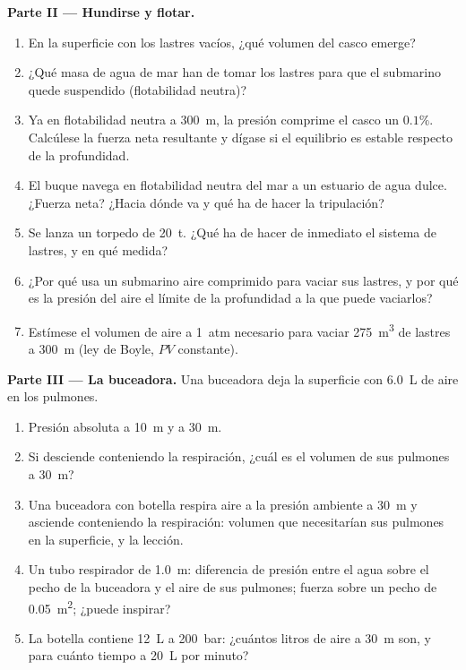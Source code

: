 \begin{problem}
\medskip
\noindent\textbf{Parte II --- Hundirse y flotar.}
\begin{enumerate}[resume]
  \item En la superficie con los lastres vacíos, ¿qué volumen del casco
        emerge?
  \item ¿Qué masa de agua de mar han de tomar los lastres para que el
        submarino quede suspendido (flotabilidad neutra)?
  \item Ya en flotabilidad neutra a \qty{300}{m}, la presión comprime el
        casco un $0.1\%$. Calcúlese la fuerza neta resultante y dígase si el
        equilibrio es estable respecto de la profundidad.
  \item El buque navega en flotabilidad neutra del mar a un estuario de
        agua dulce. ¿Fuerza neta? ¿Hacia dónde va y qué ha de hacer la
        tripulación?
  \item Se lanza un torpedo de \qty{20}{t}. ¿Qué ha de hacer de inmediato el
        sistema de lastres, y en qué medida?
  \item ¿Por qué usa un submarino aire comprimido para vaciar sus lastres, y
        por qué es la presión del aire el límite de la profundidad a la que
        puede vaciarlos?
  \item Estímese el volumen de aire a \qty{1}{atm} necesario para vaciar
        \qty{275}{m^3} de lastres a \qty{300}{m} (ley de Boyle, $PV$
        constante).
\end{enumerate}

\medskip
\noindent\textbf{Parte III --- La buceadora.}
Una buceadora deja la superficie con \qty{6.0}{L} de aire en los pulmones.
\begin{enumerate}[resume]
  \item Presión absoluta a \qty{10}{m} y a \qty{30}{m}.
  \item Si desciende conteniendo la respiración, ¿cuál es el volumen de sus
        pulmones a \qty{30}{m}?
  \item Una buceadora con botella respira aire a la presión ambiente a
        \qty{30}{m} y asciende conteniendo la respiración: volumen que
        necesitarían sus pulmones en la superficie, y la lección.
  \item Un tubo respirador de \qty{1.0}{m}: diferencia de presión entre el
        agua sobre el pecho de la buceadora y el aire de sus pulmones;
        fuerza sobre un pecho de \qty{0.05}{m^2}; ¿puede inspirar?
  \item La botella contiene \qty{12}{L} a \qty{200}{bar}: ¿cuántos litros de
        aire a \qty{30}{m} son, y para cuánto tiempo a \qty{20}{L} por
        minuto?
\end{enumerate}


\end{problem}

